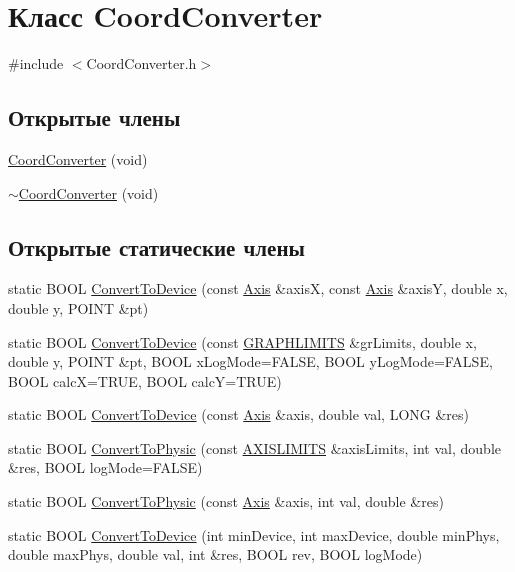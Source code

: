 \hypertarget{class_coord_converter}{\section{Класс Coord\-Converter}
\label{class_coord_converter}
}


{\ttfamily \#include $<$Coord\-Converter.\-h$>$}

\subsection*{Открытые члены}
\begin{DoxyCompactItemize}
\item 
\hyperlink{class_coord_converter_ae0c290c486210e4da7c1ac5f58501b16}{Coord\-Converter} (void)
\item 
\hyperlink{class_coord_converter_a3390c6c195f9164b274592e111898dd3}{$\sim$\-Coord\-Converter} (void)
\end{DoxyCompactItemize}
\subsection*{Открытые статические члены}
\begin{DoxyCompactItemize}
\item 
static B\-O\-O\-L \hyperlink{class_coord_converter_ad6c51c359e012fc60dd8a928d47436c8}{Convert\-To\-Device} (const \hyperlink{class_axis}{Axis} \&axis\-X, const \hyperlink{class_axis}{Axis} \&axis\-Y, double x, double y, P\-O\-I\-N\-T \&pt)
\item 
static B\-O\-O\-L \hyperlink{class_coord_converter_ad179316c879be1f1206ce49ccf318cde}{Convert\-To\-Device} (const \hyperlink{_coord_converter_8h_aef9df27fe0ea7eeb39599de1dfc8e6e1}{G\-R\-A\-P\-H\-L\-I\-M\-I\-T\-S} \&gr\-Limits, double x, double y, P\-O\-I\-N\-T \&pt, B\-O\-O\-L x\-Log\-Mode=F\-A\-L\-S\-E, B\-O\-O\-L y\-Log\-Mode=F\-A\-L\-S\-E, B\-O\-O\-L calc\-X=T\-R\-U\-E, B\-O\-O\-L calc\-Y=T\-R\-U\-E)
\item 
static B\-O\-O\-L \hyperlink{class_coord_converter_a3902abc71247c1451eab533cfb707109}{Convert\-To\-Device} (const \hyperlink{class_axis}{Axis} \&axis, double val, L\-O\-N\-G \&res)
\item 
static B\-O\-O\-L \hyperlink{class_coord_converter_a9fe141f15f40063151f823489f12dbe7}{Convert\-To\-Physic} (const \hyperlink{_coord_converter_8h_ada9330aea588ec13117cd51d2031f93c}{A\-X\-I\-S\-L\-I\-M\-I\-T\-S} \&axis\-Limits, int val, double \&res, B\-O\-O\-L log\-Mode=F\-A\-L\-S\-E)
\item 
static B\-O\-O\-L \hyperlink{class_coord_converter_ae72252145264f673ec79d846ca1b1f3d}{Convert\-To\-Physic} (const \hyperlink{class_axis}{Axis} \&axis, int val, double \&res)
\item 
static B\-O\-O\-L \hyperlink{class_coord_converter_ab62e9acc5be83e6d699e37cb11834347}{Convert\-To\-Device} (int min\-Device, int max\-Device, double min\-Phys, double max\-Phys, double val, int \&res, B\-O\-O\-L rev, B\-O\-O\-L log\-Mode)
\end{DoxyCompactItemize}


